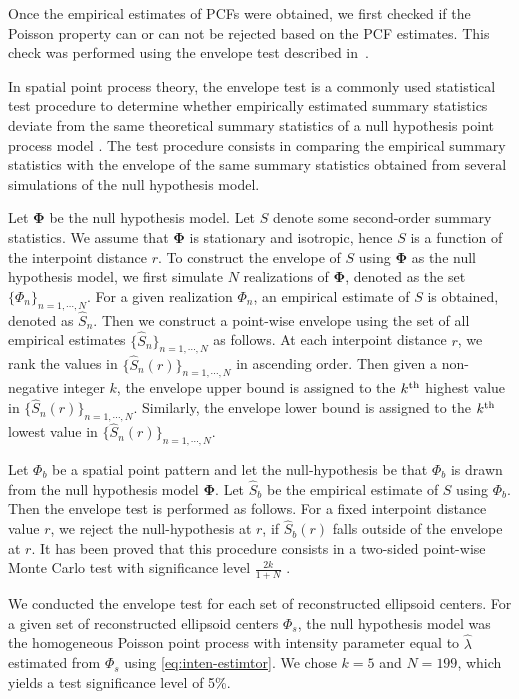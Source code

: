 \documentclass[journal]{IEEEtran}
\begin{document}
Once the empirical estimates of PCFs were obtained, we first checked
if the Poisson property can or can not be rejected based on the PCF
estimates. This check was performed using the envelope test described
in~\cite{baddeley2014tests}.

In spatial point process theory, the envelope test is a commonly used
statistical test procedure to determine whether empirically estimated
summary statistics deviate from the same theoretical summary
statistics of a null hypothesis point process model
\cite{ripley1977modelling} \cite{baddeley2014tests}. The test
procedure consists in comparing the empirical summary statistics with
the envelope of the same summary statistics obtained from several
simulations of the null hypothesis model.

Let $\mathbf{\Phi}$ be the null hypothesis model. Let $S$ denote some
second-order summary statistics. We assume that $\mathbf{\Phi}$ is
stationary and isotropic, hence $S$ is a function of the interpoint
distance $r$. To construct the envelope of $S$ using $\mathbf{\Phi}$
as the null hypothesis model, we first simulate $N$ realizations of
$\mathbf{\Phi}$, denoted as the set $\{\Phi_n\}_{n = 1, \cdots,
  N}$. For a given realization $\Phi_n$, an empirical estimate of $S$
is obtained, denoted as $\widehat{S}_n$. Then we construct a
point-wise envelope using the set of all empirical estimates
$\{\widehat{S}_n\}_{n = 1, \cdots, N}$ as follows. At each interpoint
distance $r$, we rank the values in
$\{\widehat{S}_n(r)\}_{n = 1, \cdots, N}$ in ascending order. Then
given a non-negative integer $k$, the envelope upper bound is assigned
to the $k^{\textnormal{th}}$ highest value in
$\{\widehat{S}_n(r)\}_{n = 1, \cdots, N}$. Similarly, the envelope
lower bound is assigned to the $k^{\textnormal{th}}$ lowest value in
$\{\widehat{S}_n(r)\}_{n = 1, \cdots, N}$.

Let $\Phi_b$ be a spatial point pattern and let the null-hypothesis be
that $\Phi_b$ is drawn from the null hypothesis model
$\mathbf{\Phi}$. Let $\widehat{S}_b$ be the empirical estimate of $S$
using $\Phi_b$. Then the envelope test is performed as follows. For a
fixed interpoint distance value $r$, we reject the null-hypothesis at
$r$, if $\widehat{S}_{b}(r)$ falls outside of the envelope at $r$. It
has been proved that this procedure consists in a two-sided point-wise
Monte Carlo test with significance level $\frac{2k}{1+N}$
\cite{hope1968simplified} \cite{baddeley2014tests}.

We conducted the envelope test for each set of reconstructed ellipsoid
centers. For a given set of reconstructed ellipsoid centers $\Phi_s$,
the null hypothesis model was the homogeneous Poisson point process
with intensity parameter equal to $\hat{\lambda}$ estimated from
$\Phi_s$ using \eqref{eq:inten-estimtor}. We chose $k = 5$ and
$N = 199$, which yields a test significance level of 5\%.
\end{document}
